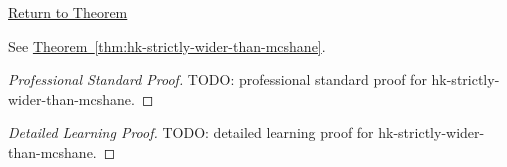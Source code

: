 \newpage
{}
\label{prf:hk-strictly-wider-than-mcshane}

\begin{remark*}[Return]
\hyperref[thm:hk-strictly-wider-than-mcshane]{Return to Theorem}
\end{remark*}

\begin{theorem*}
See \hyperref[thm:hk-strictly-wider-than-mcshane]{Theorem~\ref*{thm:hk-strictly-wider-than-mcshane}}.
\end{theorem*}

\begin{proof}[Professional Standard Proof]
\LRAProofBodyStart
TODO: professional standard proof for hk-strictly-wider-than-mcshane.
\end{proof}

\begin{proof}[Detailed Learning Proof]
\LRAProofBodyStart
TODO: detailed learning proof for hk-strictly-wider-than-mcshane.
\end{proof}

\begin{remark*}
\end{remark*}

\begin{dependencies}
\NoLocalDependencies
\end{dependencies}

\clearpage
